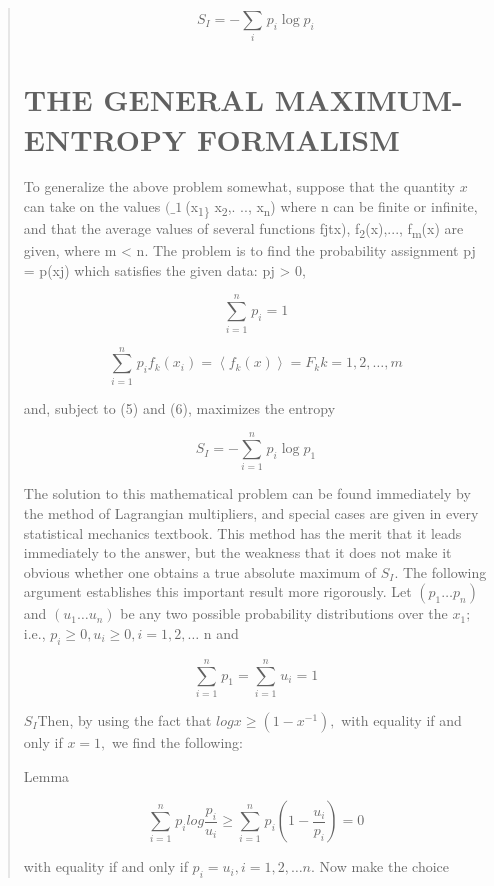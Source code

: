 \documentclass[]{article}
\begin{document}
\begin{quote}
\[S_{I} = - \sum_{i}^{}\mspace{2mu} p_{i}\log p_{i}
\]


\section{THE GENERAL MAXIMUM-ENTROPY FORMALISM}\label{the-general-maximum-entropy-formalism}

To generalize the above problem somewhat, suppose that the quantity
\(x\) can take on the values \((\_ 1\ \)(x\textsubscript{1\}}
x\textsubscript{2},. .., x\textsubscript{n}) where n can be finite or
infinite, and that the average values of several functions fjtx),
f\textsubscript{2}(x),..., f\textsubscript{m}(x) are given, where m
\textless{} n. The problem is to find the probability assignment pj =
p(xj) which satisfies the given data: pj \textgreater{} 0,

\[\sum_{i = 1}^{n}\mspace{2mu} p_{i} = 1\]

\[\sum_{i = 1}^{n}\mspace{2mu} p_{i}f_{k}\left( x_{i} \right) = \left\langle f_{k}(x) \right\rangle = F_{k}k = 1,2,\ldots,m\]

and, subject to (5) and (6), maximizes the entropy

\[S_{I} = - \sum_{i = 1}^{n}\mspace{2mu} p_{i}\log p_{1}\]

The solution to this mathematical problem can be found immediately by
the method of Lagrangian multipliers, and special cases are given in
every statistical mechanics textbook. This method has the merit that it
leads immediately to the answer, but the weakness that it does not make
it obvious whether one obtains a true absolute maximum of \(S_{I}\). The
following argument establishes this important result more rigorously.
Let \(\left( p_{1}\ldots p_{n} \right)\) and
\(\left( u_{1}\ldots u_{n} \right)\) be any two possible probability
distributions over the \(x_{1};\) i.e.,
\(p_{i} \geq 0,u_{i} \geq 0,i = 1,2,\ldots\) n and

\[\sum_{i = 1}^{n}\mspace{2mu} p_{1} = \sum_{i = 1}^{n}\mspace{2mu} u_{i} = 1\]

\(S_{I}\)Then, by using the fact that
\(logx \geq \left( 1 - x^{- 1} \right),\) with equality if and only if
\(x = 1,\) we find the following:

Lemma

\[\sum_{i = 1}^{n}\mspace{2mu} p_{i}log\frac{p_{i}}{u_{i}} \geq \sum_{i = 1}^{n}\mspace{2mu} p_{i}\left( 1 - \frac{u_{i}}{p_{i}} \right) = 0\]

with equality if and only if \(p_{i} = u_{i},i = 1,2,\ldots n\). Now
make the choice


\end{quote}
\end{document}
